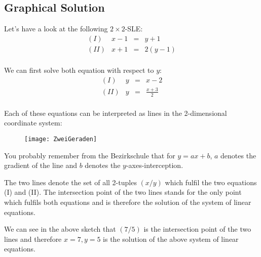


\newpage


\subsection{Graphical Solution}

Let's have a look at the following $2\times 2$-SLE:
\[
\begin{array}{lrcl}
(I)&x-1&=&y+1\\
(II)&x+1&=&2(y-1)\\
\end{array}
\]	

We can first solve both equation with respect to $y$:
\[
\begin{array}{lrcl}
(I)&y&=&x-2\\
(II)&y&=&\frac{x+3}{2}\\
\end{array}
\]	

Each of these equations can be interpreted as lines in the 2-dimensional coordinate system:


\begin{figure}[h]
\begin{center}
{\texttt{[image: ZweiGeraden]}}
\end{center} 
\end{figure}

\begin{remark}
You probably remember from the Bezirkschule that for $y=ax+b$, $a$ denotes the gradient of the line and $b$ denotes the $y$-axes-interception.
\end{remark}

The two lines denote the set of all 2-tuples $(x/y)$ which fulfil the two equations (I) and (II). The intersection point of the two lines stands for the only point which fulfils both equations and is therefore the solution of the system of linear equations. 
\vsp

We can see in the above sketch that $(7/5)$ is the intersection point of the two lines and therefore $x=7, y=5$ is the solution of the above system of linear equations.


